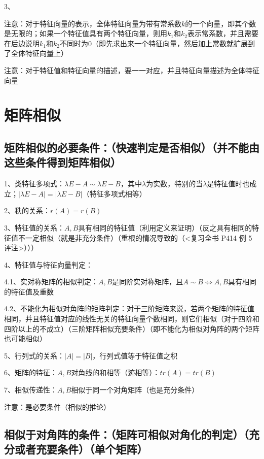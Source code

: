 3、



注意：对于特征向量的表示，全体特征向量为带有常系数$k$的一个向量，即其个数是无限的；如果一个特征值具有两个特征向量，则用$k_1$和$k_2$表示常系数，并且需要在后边说明$k_1$和$k_2$不同时为0（即先求出来一个特征向量，然后加上常数就扩展到了全体特征向量上）

注意：对于特征值和特征向量的描述，要一一对应，并且特征向量描述为全体特征向量

\section{矩阵相似}



\subsection{矩阵相似的必要条件：（快速判定是否相似）（并不能由这些条件得到矩阵相似）}

1、类特征多项式：$\lambda E-A\sim \lambda E-B$，其中$\lambda$为实数，特别的当$\lambda$是特征值时也成立；$|\lambda E-A|=|\lambda E-B|$（特征多项式相等）

2、秩的关系：$r(A)=r(B)$

3、特征值的关系：$A,B$具有相同的特征值（利用定义来证明）（反之具有相同的特征值不一定相似（就是非充分条件）（重根的情况导致的（<复习全书 P414 例 5 评注>）））

4、特征值与特征向量判定：

4.1、实对称矩阵的相似判定：$A,B$是同阶实对称矩阵，且$A \sim B \Leftrightarrow A,B$具有相同的特征值及重数 

4.2、不能化为相似对角阵的矩阵判定：对于三阶矩阵来说，若两个矩阵的特征值相同，并且特征值对应的线性无关的特征向量个数相同，则它们相似（对于四阶和四阶以上的不成立）（三阶矩阵相似充要条件）（即不能化为相似对角阵的两个矩阵也可能相似）

5、行列式的关系：$|A|=|B|$，行列式值等于特征值之积

6、矩阵的特征：$A,B$对角线的和相等（迹相等）：$tr(A)=tr(B)$

7、相似传递性：$A,B$相似于同一个对角矩阵（也是充分条件）

注意：是必要条件（相似的推论）



\subsection{相似于对角阵的条件：（矩阵可相似对角化的判定）（充分或者充要条件）（单个矩阵）}

